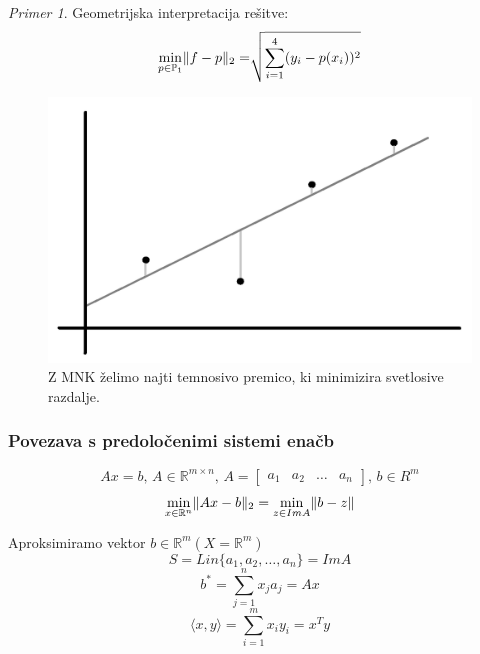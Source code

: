 \documentclass[a4paper,12pt]{article}
\DeclarePairedDelimiter\norm{\lVert}{\rVert}
\newcommand{\innerproduct}[2]{\langle #1, #2 \rangle}
\theoremstyle{definition}
\theoremstyle{remark}
\newtheorem*{ex}{Primer}
\newcommand{\R}{\mathbb{R}}
\newcommand{\Pp}{\mathbb{P}}
\begin{document}
\begin{ex}
    Geometrijska interpretacija rešitve:
    \begin{equation*}
        \min_{p \in \Pp_1} \norm{f - p}_2 =\sqrt[]{\sum_{i = 1}^{4} (y_i -p(x_i))^2}
    \end{equation*}
    \begin{figure}[h]
        \center
        \includegraphics[scale=0.25]{mnk_geo_druga.png}
        \caption{Z MNK želimo najti temnosivo premico, ki minimizira svetlosive razdalje.}
    \end{figure}
\end{ex}
\subsubsection{Povezava s predoločenimi sistemi enačb}
\begin{equation*}
    Ax = b \text{, } A\in \R^{m \times n} \text{, } A = 
    \begin{bmatrix}
        a_1 & a_2 & \dots & a_n
    \end{bmatrix} \text{, }  b \in R^m
\end{equation*}
\begin{equation*}
    \min_{x \in \R^n} \norm{Ax - b}_2 = \min_{z \in ImA} \norm{b - z}
\end{equation*}

Aproksimiramo vektor $b \in \R^m (X = \R^m)$
\begin{equation*}
    S = Lin\{a_1, a_2, \dots, a_n\} = ImA
\end{equation*}
\begin{equation*}
    b^* = \sum_{j = 1}^{n}x_j a_j = Ax
\end{equation*}
\begin{equation*}
    \innerproduct{x}{y} = \sum_{i = 1}^{m}x_i y_i = x^T y
\end{equation*}
\end{document}
